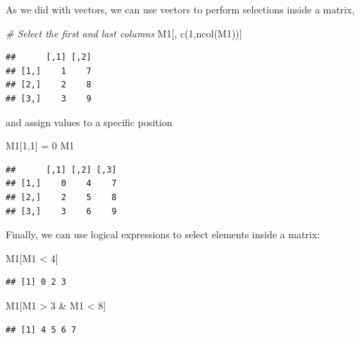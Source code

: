 \documentclass[
]{book}
\newenvironment{Shaded}{\begin{snugshade}}{\end{snugshade}}
\newcommand{\CommentTok}[1]{\textcolor[rgb]{0.56,0.35,0.01}{\textit{#1}}}
\newcommand{\DecValTok}[1]{\textcolor[rgb]{0.00,0.00,0.81}{#1}}
\newcommand{\FunctionTok}[1]{\textcolor[rgb]{0.00,0.00,0.00}{#1}}
\newcommand{\NormalTok}[1]{#1}
\newcommand{\OtherTok}[1]{\textcolor[rgb]{0.56,0.35,0.01}{#1}}
\newcommand{\SpecialCharTok}[1]{\textcolor[rgb]{0.00,0.00,0.00}{#1}}
\theoremstyle{definition}
\theoremstyle{definition}
\theoremstyle{definition}
\theoremstyle{definition}
\theoremstyle{remark}
\begin{document}
As we did with vectors, we can use vectors to perform selections inside a matrix,

\begin{Shaded}
\begin{Highlighting}[]
\CommentTok{\# Select the first and last columns}
\NormalTok{M1[, }\FunctionTok{c}\NormalTok{(}\DecValTok{1}\NormalTok{,}\FunctionTok{ncol}\NormalTok{(M1))]}
\end{Highlighting}
\end{Shaded}

\begin{verbatim}
##      [,1] [,2]
## [1,]    1    7
## [2,]    2    8
## [3,]    3    9
\end{verbatim}

and assign values to a specific position

\begin{Shaded}
\begin{Highlighting}[]
\NormalTok{M1[}\DecValTok{1}\NormalTok{,}\DecValTok{1}\NormalTok{] }\OtherTok{=} \DecValTok{0}
\NormalTok{M1}
\end{Highlighting}
\end{Shaded}

\begin{verbatim}
##      [,1] [,2] [,3]
## [1,]    0    4    7
## [2,]    2    5    8
## [3,]    3    6    9
\end{verbatim}

Finally, we can use logical expressions to select elements inside a matrix:

\begin{Shaded}
\begin{Highlighting}[]
\NormalTok{M1[M1 }\SpecialCharTok{\textless{}} \DecValTok{4}\NormalTok{]}
\end{Highlighting}
\end{Shaded}

\begin{verbatim}
## [1] 0 2 3
\end{verbatim}

\begin{Shaded}
\begin{Highlighting}[]
\NormalTok{M1[M1 }\SpecialCharTok{\textgreater{}} \DecValTok{3} \SpecialCharTok{\&}\NormalTok{ M1 }\SpecialCharTok{\textless{}} \DecValTok{8}\NormalTok{]}
\end{Highlighting}
\end{Shaded}

\begin{verbatim}
## [1] 4 5 6 7
\end{verbatim}
\end{document}
